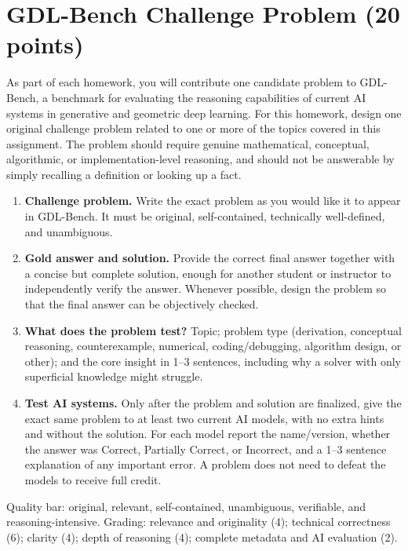 \section{GDL-Bench Challenge Problem (20 points)}

\begin{question}
As part of each homework, you will contribute one candidate problem to GDL-Bench, a benchmark for evaluating the reasoning capabilities of current AI systems in generative and geometric deep learning. For this homework, design one original challenge problem related to one or more of the topics covered in this assignment. The problem should require genuine mathematical, conceptual, algorithmic, or implementation-level reasoning, and should not be answerable by simply recalling a definition or looking up a fact.
\begin{enumerate}
  \item[(a)] \textbf{Challenge problem.} Write the exact problem as you would like it to appear in GDL-Bench. It must be original, self-contained, technically well-defined, and unambiguous.
  \item[(b)] \textbf{Gold answer and solution.} Provide the correct final answer together with a concise but complete solution, enough for another student or instructor to independently verify the answer. Whenever possible, design the problem so that the final answer can be objectively checked.
  \item[(c)] \textbf{What does the problem test?} Topic; problem type (derivation, conceptual reasoning, counterexample, numerical, coding/debugging, algorithm design, or other); and the core insight in 1--3 sentences, including why a solver with only superficial knowledge might struggle.
  \item[(d)] \textbf{Test AI systems.} Only after the problem and solution are finalized, give the exact same problem to at least two current AI models, with no extra hints and without the solution. For each model report the name/version, whether the answer was Correct, Partially Correct, or Incorrect, and a 1--3 sentence explanation of any important error. A problem does not need to defeat the models to receive full credit.
\end{enumerate}
Quality bar: original, relevant, self-contained, unambiguous, verifiable, and reasoning-intensive. Grading: relevance and originality (4); technical correctness (6); clarity (4); depth of reasoning (4); complete metadata and AI evaluation (2).
\end{question}

